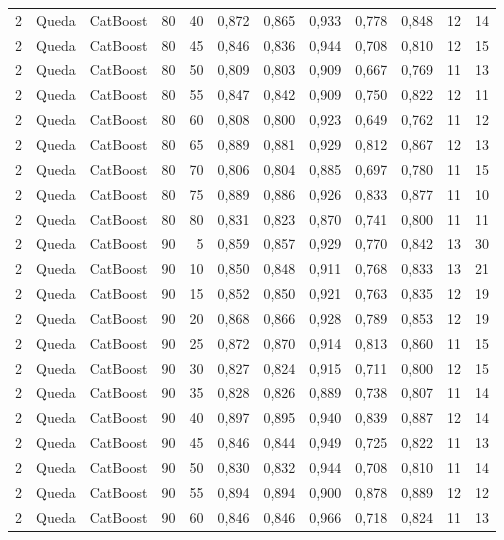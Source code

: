\begin{longtable}{ccclrrrrrrrr}
2 & Queda & CatBoost & 80 & 40 & 0,872 & 0,865 & 0,933 & 0,778 & 0,848 & 12 & 14 \\
2 & Queda & CatBoost & 80 & 45 & 0,846 & 0,836 & 0,944 & 0,708 & 0,810 & 12 & 15 \\
2 & Queda & CatBoost & 80 & 50 & 0,809 & 0,803 & 0,909 & 0,667 & 0,769 & 11 & 13 \\
2 & Queda & CatBoost & 80 & 55 & 0,847 & 0,842 & 0,909 & 0,750 & 0,822 & 12 & 11 \\
2 & Queda & CatBoost & 80 & 60 & 0,808 & 0,800 & 0,923 & 0,649 & 0,762 & 11 & 12 \\
2 & Queda & CatBoost & 80 & 65 & 0,889 & 0,881 & 0,929 & 0,812 & 0,867 & 12 & 13 \\
2 & Queda & CatBoost & 80 & 70 & 0,806 & 0,804 & 0,885 & 0,697 & 0,780 & 11 & 15 \\
2 & Queda & CatBoost & 80 & 75 & 0,889 & 0,886 & 0,926 & 0,833 & 0,877 & 11 & 10 \\
2 & Queda & CatBoost & 80 & 80 & 0,831 & 0,823 & 0,870 & 0,741 & 0,800 & 11 & 11 \\
2 & Queda & CatBoost & 90 & 5 & 0,859 & 0,857 & 0,929 & 0,770 & 0,842 & 13 & 30 \\
2 & Queda & CatBoost & 90 & 10 & 0,850 & 0,848 & 0,911 & 0,768 & 0,833 & 13 & 21 \\
2 & Queda & CatBoost & 90 & 15 & 0,852 & 0,850 & 0,921 & 0,763 & 0,835 & 12 & 19 \\
2 & Queda & CatBoost & 90 & 20 & 0,868 & 0,866 & 0,928 & 0,789 & 0,853 & 12 & 19 \\
2 & Queda & CatBoost & 90 & 25 & 0,872 & 0,870 & 0,914 & 0,813 & 0,860 & 11 & 15 \\
2 & Queda & CatBoost & 90 & 30 & 0,827 & 0,824 & 0,915 & 0,711 & 0,800 & 12 & 15 \\
2 & Queda & CatBoost & 90 & 35 & 0,828 & 0,826 & 0,889 & 0,738 & 0,807 & 11 & 14 \\
2 & Queda & CatBoost & 90 & 40 & 0,897 & 0,895 & 0,940 & 0,839 & 0,887 & 12 & 14 \\
2 & Queda & CatBoost & 90 & 45 & 0,846 & 0,844 & 0,949 & 0,725 & 0,822 & 11 & 13 \\
2 & Queda & CatBoost & 90 & 50 & 0,830 & 0,832 & 0,944 & 0,708 & 0,810 & 11 & 14 \\
2 & Queda & CatBoost & 90 & 55 & 0,894 & 0,894 & 0,900 & 0,878 & 0,889 & 12 & 12 \\
2 & Queda & CatBoost & 90 & 60 & 0,846 & 0,846 & 0,966 & 0,718 & 0,824 & 11 & 13 \\

\end{longtable}
